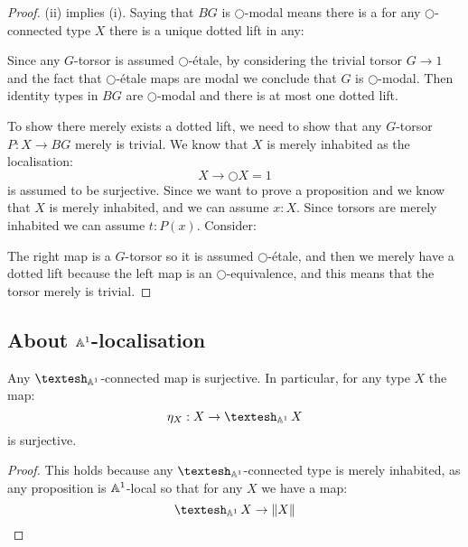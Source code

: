 \begin{proof}
  (ii) implies (i). Saying that $BG$ is $\bigcirc$-modal means there is a for any $\bigcirc$-connected type $X$ there is a unique dotted lift in any:
        \begin{center}
  \end{center}
Since any $G$-torsor is assumed $\bigcirc$-étale, by considering the trivial torsor $G\to 1$ and the fact that $\bigcirc$-étale maps are modal we conclude that $G$ is $\bigcirc$-modal. Then identity types in $BG$ are $\bigcirc$-modal and there is at most one dotted lift.
 
 To show there merely exists a dotted lift, we need to show that any $G$-torsor $P:X\to BG$ merely is trivial. We know that $X$ is merely inhabited as the localisation:
 \[X\to \bigcirc X = 1\]
 is assumed to be surjective. Since we want to prove a proposition and we know that $X$ is merely inhabited, and we can assume $x:X$. Since torsors are merely inhabited we can assume $t:P(x)$. Consider:
    \begin{center}
  \end{center}
 The right map is a $G$-torsor so it is assumed $\bigcirc$-étale, and then we merely have a dotted lift because the left map is an $\bigcirc$-equivalence, and this means that the torsor merely is trivial.
 
\end{proof}

\subsection{About $\mathbb{A}^1$-localisation}

\begin{lemma}\label{A1-replacement-surjective}
Any $\shape_{\A^1}$-connected map is surjective. In particular, for any type $X$ the map:
\[\eta_X:X\to \shape_{\A^1}X\]
is surjective.
\end{lemma}

\begin{proof}
This holds because any $\shape_{\A^1}$-connected type is merely inhabited, as any proposition is $\mathbb{A}^1$-local so that for any $X$ we have a map:
\[\shape_{\A^1}X \to \propTrunc{X}\]
\end{proof}


